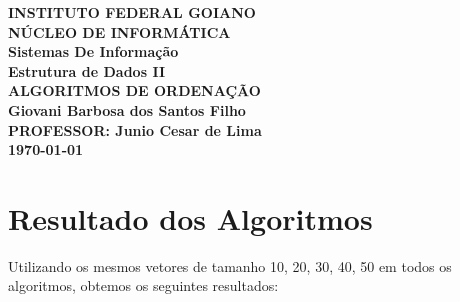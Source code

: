 \documentclass{article}
\begin{document}
	\begin{center}
	\large
			\textbf{INSTITUTO FEDERAL GOIANO\\
				NÚCLEO DE INFORMÁTICA\\
				Sistemas De Informação\\
				Estrutura de Dados II\\\vspace{4.5cm}
				ALGORITMOS DE ORDENAÇÃO \\\vspace{3.0cm}
				\textbf{Giovani Barbosa dos Santos Filho}\\\vspace{2cm}
				PROFESSOR: Junio Cesar de Lima \\\vspace{8cm}
				\today
			}
	\end{center}
	 

	 \newpage

	 
	 
	 \section{Resultado dos Algoritmos}
	 	
	\indent Utilizando os mesmos vetores de tamanho 10, 20, 30, 40, 50 em todos os algoritmos, obtemos os seguintes resultados:
\end{document}
